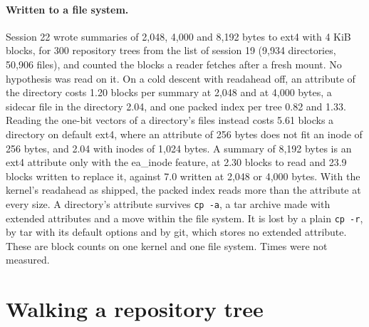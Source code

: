 \documentclass[11pt]{article}
\begin{document}
\paragraph{Written to a file system.} Session 22 wrote summaries of 2,048, 4,000 and 8,192 bytes to ext4 with 4 KiB blocks, for 300 repository trees from the list of session 19 (9,934 directories, 50,906 files), and counted the blocks a reader fetches after a fresh mount. No hypothesis was read on it. On a cold descent with readahead off, an attribute of the directory costs 1.20 blocks per summary at 2,048 and at 4,000 bytes, a sidecar file in the directory 2.04, and one packed index per tree 0.82 and 1.33. Reading the one-bit vectors of a directory's files instead costs 5.61 blocks a directory on default ext4, where an attribute of 256 bytes does not fit an inode of 256 bytes, and 2.04 with inodes of 1,024 bytes. A summary of 8,192 bytes is an ext4 attribute only with the ea\_inode feature, at 2.30 blocks to read and 23.9 blocks written to replace it, against 7.0 written at 2,048 or 4,000 bytes. With the kernel's readahead as shipped, the packed index reads more than the attribute at every size. A directory's attribute survives \texttt{cp -a}, a tar archive made with extended attributes and a move within the file system. It is lost by a plain \texttt{cp -r}, by tar with its default options and by git, which stores no extended attribute. These are block counts on one kernel and one file system. Times were not measured.

\section{Walking a repository tree}
\label{sec:tree}
\end{document}
